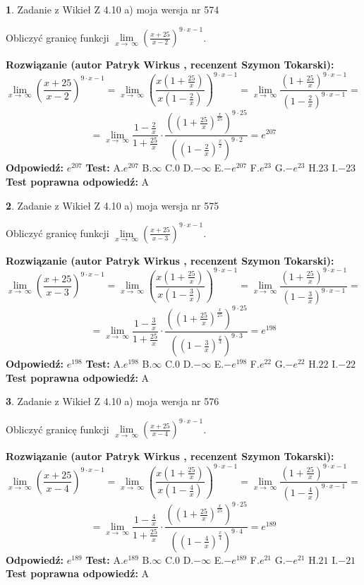 \documentclass[12pt, a4paper]{article}
\theoremstyle{definition} %
\newtheorem{zad}{}
\newcommand{\zadStart}[1]{\begin{zad}#1\newline}
\newcommand{\zadStop}{\end{zad}}
\newcommand{\rozwStart}[2]{\noindent \textbf{Rozwiązanie (autor #1 , recenzent #2): }\newline}
\newcommand{\rozwStop}{\newline}
\newcommand{\odpStart}{\noindent \textbf{Odpowiedź:}\newline}
\newcommand{\odpStop}{\newline}
\newcommand{\testStart}{\noindent \textbf{Test:}\newline}
\newcommand{\testStop}{\newline}
\newcommand{\kluczStart}{\noindent \textbf{Test poprawna odpowiedź:}\newline}
\newcommand{\kluczStop}{\newline}
\begin{document}
\zadStart{Zadanie z Wikieł Z 4.10 a) moja wersja nr 574}

Obliczyć granicę funkcji  $\lim\limits_{x\to\ \infty}(\frac{x+25}{x-2})^{9\cdot x-1}$.
\zadStop
\rozwStart{Patryk Wirkus}{Szymon Tokarski}
$$\lim\limits_{x\to\ \infty}(\frac{x+25}{x-2})^{9\cdot x-1} = \lim\limits_{x\to\ \infty}(\frac{x(1+\frac{25}{x})}{x(1-\frac{2}{x})})^{9\cdot x-1}=\lim\limits_{x\to\ \infty}\frac{(1+\frac{25}{x})^{9\cdot x-1}}{(1-\frac{2}{x})^{9\cdot x-1}}=$$
$$=\lim\limits_{x\to\ \infty}\frac{1-\frac{2}{x}}{1+\frac{25}{x}}\cdot\frac{((1+\frac{25}{x})^{\frac{x}{25}})^{9\cdot25}}{((1-\frac{2}{x})^{\frac{x}{2}})^{9\cdot2}}=e^{207}$$
\rozwStop
\odpStart
$e^{207}$
\odpStop
\testStart
A.$e^{207}$ B.$\infty$ C.$0$ D.$-\infty$ E.$-e^{207}$
F.$e^{23}$ G.$-e^{23}$
H.$23$
I.$-23$
\testStop
\kluczStart
A
\kluczStop



\zadStart{Zadanie z Wikieł Z 4.10 a) moja wersja nr 575}

Obliczyć granicę funkcji  $\lim\limits_{x\to\ \infty}(\frac{x+25}{x-3})^{9\cdot x-1}$.
\zadStop
\rozwStart{Patryk Wirkus}{Szymon Tokarski}
$$\lim\limits_{x\to\ \infty}(\frac{x+25}{x-3})^{9\cdot x-1} = \lim\limits_{x\to\ \infty}(\frac{x(1+\frac{25}{x})}{x(1-\frac{3}{x})})^{9\cdot x-1}=\lim\limits_{x\to\ \infty}\frac{(1+\frac{25}{x})^{9\cdot x-1}}{(1-\frac{3}{x})^{9\cdot x-1}}=$$
$$=\lim\limits_{x\to\ \infty}\frac{1-\frac{3}{x}}{1+\frac{25}{x}}\cdot\frac{((1+\frac{25}{x})^{\frac{x}{25}})^{9\cdot25}}{((1-\frac{3}{x})^{\frac{x}{3}})^{9\cdot3}}=e^{198}$$
\rozwStop
\odpStart
$e^{198}$
\odpStop
\testStart
A.$e^{198}$ B.$\infty$ C.$0$ D.$-\infty$ E.$-e^{198}$
F.$e^{22}$ G.$-e^{22}$
H.$22$
I.$-22$
\testStop
\kluczStart
A
\kluczStop



\zadStart{Zadanie z Wikieł Z 4.10 a) moja wersja nr 576}

Obliczyć granicę funkcji  $\lim\limits_{x\to\ \infty}(\frac{x+25}{x-4})^{9\cdot x-1}$.
\zadStop
\rozwStart{Patryk Wirkus}{Szymon Tokarski}
$$\lim\limits_{x\to\ \infty}(\frac{x+25}{x-4})^{9\cdot x-1} = \lim\limits_{x\to\ \infty}(\frac{x(1+\frac{25}{x})}{x(1-\frac{4}{x})})^{9\cdot x-1}=\lim\limits_{x\to\ \infty}\frac{(1+\frac{25}{x})^{9\cdot x-1}}{(1-\frac{4}{x})^{9\cdot x-1}}=$$
$$=\lim\limits_{x\to\ \infty}\frac{1-\frac{4}{x}}{1+\frac{25}{x}}\cdot\frac{((1+\frac{25}{x})^{\frac{x}{25}})^{9\cdot25}}{((1-\frac{4}{x})^{\frac{x}{4}})^{9\cdot4}}=e^{189}$$
\rozwStop
\odpStart
$e^{189}$
\odpStop
\testStart
A.$e^{189}$ B.$\infty$ C.$0$ D.$-\infty$ E.$-e^{189}$
F.$e^{21}$ G.$-e^{21}$
H.$21$
I.$-21$
\testStop
\kluczStart
A
\kluczStop
\end{document}
